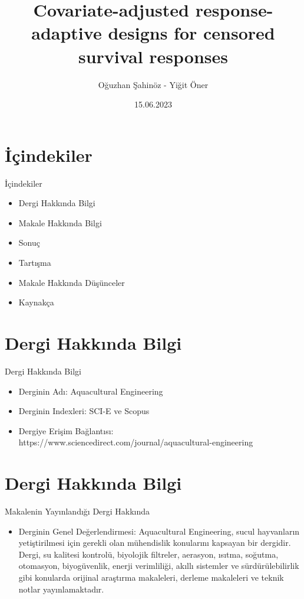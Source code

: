 \documentclass{beamer}
\title[Your Short Title]{Covariate-adjusted response-adaptive designs for censored survival responses}
\author{Oğuzhan Şahinöz - Yiğit Öner}
\institute{21936321 - 21822049}
\date{15.06.2023}
\begin{document}
\begin{frame}
  \titlepage
\end{frame}

\section{İçindekiler}

\begin{frame}{İçindekiler}

\begin{itemize}
  \item Dergi Hakkında Bilgi
  \item Makale Hakkında Bilgi
  \item Sonuç
  \item Tartışma
  \item Makale Hakkında Düşünceler 
  \item Kaynakça
\end{itemize}
\end{frame}

\section{Dergi Hakkında Bilgi}

\begin{frame}{Dergi Hakkında Bilgi}
\begin{itemize}
  \item Derginin Adı: Aquacultural Engineering
  \item Derginin Indexleri: SCI-E ve Scopus 
  \item Dergiye Erişim Bağlantısı: https://www.sciencedirect.com/journal/aquacultural-engineering 
\end{itemize}
\end{frame}

\section{Dergi Hakkında Bilgi}

\begin{frame}{Makalenin Yayınlandığı Dergi Hakkında}
\begin{itemize}
  \item Derginin Genel Değerlendirmesi: Aquacultural Engineering, sucul hayvanların yetiştirilmesi için gerekli olan mühendislik konularını kapsayan bir dergidir. Dergi, su kalitesi kontrolü, biyolojik filtreler, aerasyon, ısıtma, soğutma, otomasyon, biyogüvenlik, enerji verimliliği, akıllı sistemler ve sürdürülebilirlik gibi konularda orijinal araştırma makaleleri, derleme makaleleri ve teknik notlar yayınlamaktadır.
\end{itemize}
\end{frame}
\end{document}
